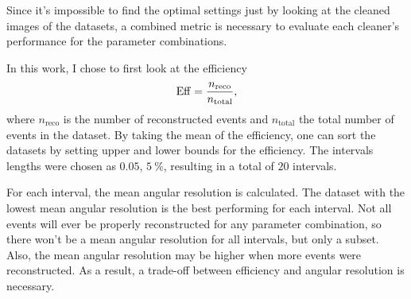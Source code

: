 Since it's impossible to find the optimal settings just by looking at the
cleaned images of the datasets, a combined metric is necessary to evaluate each cleaner's performance
for the parameter combinations.

In this work, I chose to first look at the efficiency
\begin{equation}
    \operatorname{Eff} =  \frac{n_{\mathrm{reco}}}{n_{\mathrm{total}}},
\end{equation}
where \(n_{\mathrm{reco}}\) is the number of reconstructed events and \(n_{\mathrm{total}}\)
the total number of events in the dataset. By taking the mean of the efficiency, one can sort the
datasets by setting upper and lower bounds for the efficiency. The intervals lengths were chosen as
\(\num{0.05}\), \ie \(\SI{5}{\percent}\), resulting in a total of \(\num{20}\) intervals.

For each interval, the mean angular resolution is calculated. The dataset with the lowest mean angular
resolution is the best performing for each interval. Not all events will ever be properly reconstructed
for any parameter combination, so there won't be a mean angular resolution for all intervals, but only
a subset. Also, the mean angular resolution may be higher when more events were reconstructed.
As a result, a trade-off between efficiency and angular resolution is necessary.

